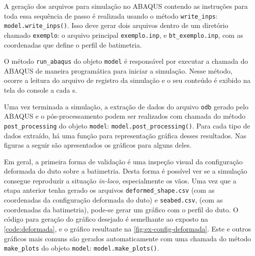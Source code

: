 
A geração dos arquivos para simulação no ABAQUS contendo as instruções para toda essa sequência de passo é realizada usando o método \texttt{write\_inps}: \texttt{model.write\_inps()}.
Isso deve gerar dois arquivos dentro de um diretório chamado \texttt{exemplo}: o arquivo principal \texttt{exemplo.inp}, e \texttt{bt\_exemplo.inp}, com as coordenadas que define o perfil de batimetria. \par

O método \texttt{run\_abaqus} do objeto \texttt{model} é responsável por executar a chamada do ABAQUS de maneira programática para iniciar a simulação.
Nesse método, ocorre a leitura do arquivo de registro da simulação e o seu conteúdo é exibido na tela do console a cada \unit[5]{s}.

Uma vez terminada a simulação, a extração de dados do arquivo \texttt{odb} gerado pelo ABAQUS e o pós-processamento podem ser realizados com chamada do método \texttt{post\_processing} do objeto \texttt{model}: \texttt{model.post\_processing()}.
Para cada tipo de dados extraído, há uma função para representação gráfica desses resultados. Nas figuras a seguir são apresentados os gráficos para alguns deles. %

Em geral, a primeira forma de validação é uma inspeção visual da configuração deformada do duto sobre a batimetria. Desta forma é possível ver se a simulação consegue reproduzir a situação \textit{in-loco}, especialmente os vãos. Uma vez que a etapa anterior tenha gerado os arquivos \texttt{deformed\_shape.csv} (com as coordenadas da configuração deformada do duto) e \texttt{seabed.csv}, (com as coordenadas da batimetria), pode-se gerar um gráfico com o perfil do duto. O código para geração do gráfico desejado é semelhante ao exposto na \autoref{code:deformada}, e o gráfico resultante na \autoref{fig:ex-config-deformada}. Este e outros gráficos mais comuns são gerados automaticamente com uma chamada do método \texttt{make\_plots} do objeto \texttt{model}: \texttt{model.make\_plots()}.

